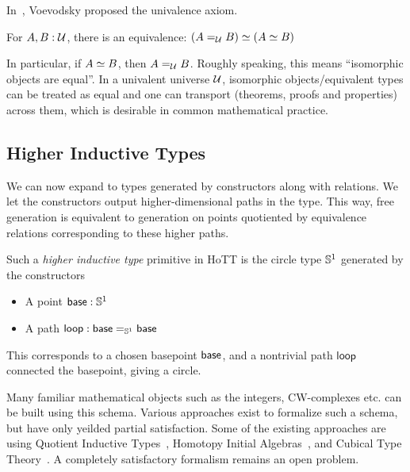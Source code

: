 In~\cite{kapulkin2021simplicial}, Voevodsky proposed the univalence axiom.
\begin{axiom}[Univalence]
  For $A, B : \mathcal{U}$, there is an equivalence:
  $(A =_{\mathcal{U}} B) \simeq (A \simeq B) $
\end{axiom}
In particular, if $A \simeq B$, then $A =_{\mathcal{U}} B$.
Roughly speaking, this means ``isomorphic objects are equal''. 
In a univalent universe $\mathcal{U}$, isomorphic objects/equivalent types can be treated as equal and one can transport 
(theorems, proofs and properties) across them, which is desirable in common mathematical practice.

\subsection{Higher Inductive Types}

We can now expand to types generated by constructors along with relations.
We let the constructors output higher-dimensional paths in the type. This way, 
free generation is equivalent to generation on points quotiented by equivalence relations corresponding to these higher paths.

Such a \textit{higher inductive type} primitive in HoTT is the circle type $\mathbb{S}^1$ generated by the constructors
\begin{itemize}
  \item A point $\mathsf{base} : \mathbb{S}^1$
  \item A path $ \mathsf{loop} : \mathsf{base} =_{\mathbb{S}^1} \mathsf{base} $
\end{itemize}
This corresponds to a chosen basepoint $\mathsf{base}$, and a nontrivial path $\mathsf{loop}$ connected the basepoint,
giving a circle.

Many familiar mathematical objects such as the integers, CW-complexes etc. can be built using
this schema. Various approaches exist to formalize such a schema, but have only yeilded partial satisfaction. 
Some of the existing approaches are using Quotient Inductive Types~\cite{altenkirch2016type}, Homotopy Initial Algebras~\cite{sojakova2015higher},
and Cubical Type Theory~\cite{cohen2016cubical, cavallo2021higher}. A completely satisfactory formalism remains an open problem.
